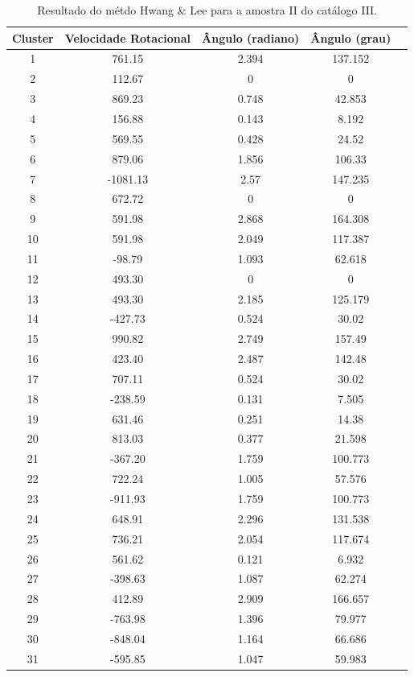 {\scriptsize
\begin{longtable}{ccccc}
\caption{Resultado do métdo Hwang \& Lee para a amostra II do catálogo III.}\label{tab:norotationhwang}
\hline
\multicolumn{1}{l}{\textbf{Cluster}} & \multicolumn{1}{l}{\textbf{Velocidade Rotacional}} & \multicolumn{1}{l}{\textbf{Ângulo (radiano)}} & \multicolumn{1}{l}{\textbf{Ângulo (grau)}} \\ \hline
1 & 761.15 & 2.394 & 137.152 \\
2 & 112.67 & 0 & 0 \\
3 & 869.23 & 0.748 & 42.853 \\
4 & 156.88 & 0.143 & 8.192 \\
5 & 569.55 & 0.428 & 24.52 \\
6 & 879.06 & 1.856 & 106.33 \\
7 & -1081.13 & 2.57 & 147.235 \\
8 & 672.72 & 0 & 0 \\
9 & 591.98 & 2.868 & 164.308 \\
10 & 591.98 & 2.049 & 117.387 \\
11 & -98.79 & 1.093 & 62.618 \\
12 & 493.30 & 0 & 0 \\
13 & 493.30 & 2.185 & 125.179 \\
14 & -427.73 & 0.524 & 30.02 \\
15 & 990.82 & 2.749 & 157.49 \\
16 & 423.40 & 2.487 & 142.48 \\
17 & 707.11 & 0.524 & 30.02 \\
18 & -238.59 & 0.131 & 7.505 \\
19 & 631.46 & 0.251 & 14.38 \\
20 & 813.03 & 0.377 & 21.598 \\
21 & -367.20 & 1.759 & 100.773 \\
22 & 722.24 & 1.005 & 57.576 \\
23 & -911.93 & 1.759 & 100.773 \\
24 & 648.91 & 2.296 & 131.538 \\
25 & 736.21 & 2.054 & 117.674 \\
26 & 561.62 & 0.121 & 6.932 \\
27 & -398.63 & 1.087 & 62.274 \\
28 & 412.89 & 2.909 & 166.657 \\
29 & -763.98 & 1.396 & 79.977 \\
30 & -848.04 & 1.164 & 66.686 \\
31 & -595.85 & 1.047 & 59.983 \\

\end{longtable}}
